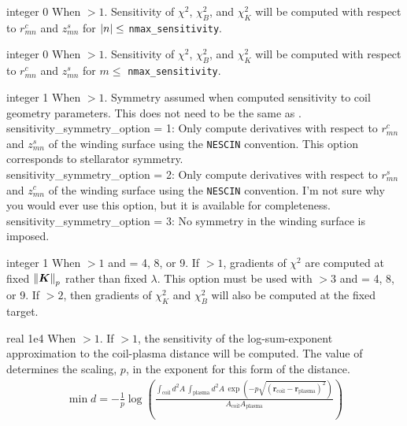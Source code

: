 \myhrule

{integer}
{0}
{When  $> 1$.}
{Sensitivity of $\chi^2$, $\chi^2_B$, and $\chi^2_K$ will be computed with respect to $r_{mn}^c$ and $z_{mn}^s$ for $\abs{n} \leq $ \texttt{nmax\_sensitivity}.}

\myhrule

{integer}
{0}
{When  $> 1$.}
{Sensitivity of $\chi^2$, $\chi^2_B$, and $\chi^2_K$ will be computed with respect to $r_{mn}^c$ and $z_{mn}^s$ for $m \leq $ \texttt{nmax\_sensitivity}.}

\myhrule

{integer}
{1}
{When  $> 1$.}
{Symmetry assumed when computed sensitivity to coil geometry parameters. This does not need to be the same as . \\
{\ttfamily sensitivity\_symmetry\_option} = 1: Only compute derivatives with respect to $r_{mn}^c$ and $z_{mn}^s$ of the winding surface using the \texttt{NESCIN} convention. This option corresponds to stellarator symmetry.\\

{\ttfamily sensitivity\_symmetry\_option} = 2: Only compute derivatives with respect to $r_{mn}^s$ and $z_{mn}^c$ of the winding surface using the \texttt{NESCIN} convention. I'm not sure why you would ever use this option,
but it is available for completeness.\\

{\ttfamily sensitivity\_symmetry\_option} = 3: No symmetry in the winding surface is imposed. 
}

\myhrule

{integer}
{1}
{When  $> 1$ and  = 4, 8, or 9.}
{If  $>1$, gradients of $\chi^2$ are computed at fixed $\norm{\bm{K}}_p$ rather than fixed $\lambda$. This option must be used with  $> 3$ and   = 4, 8, or 9. If  $>2$, then gradients of $\chi^2_K$ and $\chi^2_B$ will also be computed at the fixed target. 
}

\myhrule

{real}
{1e4}
{When  $> 1$.}
{If  $>1$, the sensitivity of the log-sum-exponent approximation to the coil-plasma distance will be computed. The value of  determines the scaling, $p$, in the exponent for this form of the distance.
\begin{gather}
\min d = - \frac{1}{p} \log \left( \frac{ \int_{\text{coil}} d^2 A \, \int_{\text{plasma}} d^2 A \, \exp \left( - p \sqrt{ (\bm{r}_{\text{coil}} - \bm{r}_{\text{plasma}})^2 } \right) }{A_{\text{coil}} A_{\text{plasma}}} \right)
\end{gather}
}

